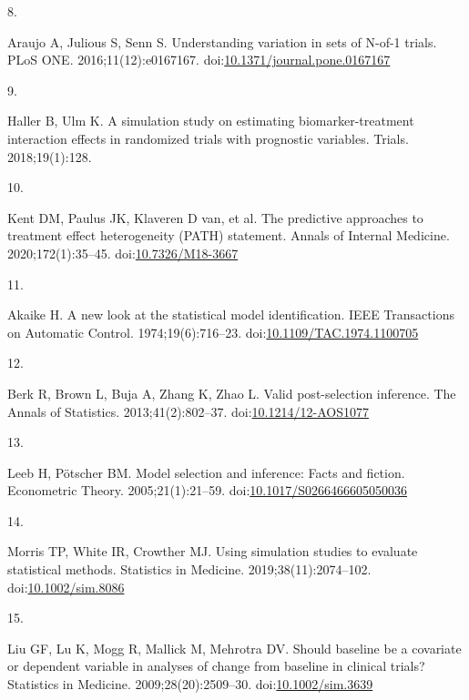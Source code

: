 \documentclass[
  11pt,
]{article}
\newlength{\cslhangindent}
\newlength{\csllabelwidth}
\newenvironment{CSLReferences}[2] %
 {\begin{list}{}{%
  \setlength{\itemindent}{0pt}
  \setlength{\leftmargin}{0pt}
  \setlength{\parsep}{0pt}
  \ifodd #1
   \setlength{\leftmargin}{\cslhangindent}
   \setlength{\itemindent}{-1\cslhangindent}
  \fi
  \setlength{\itemsep}{#2\baselineskip}}}
 {\end{list}}
\newcommand{\CSLLeftMargin}[1]{\parbox[t]{\csllabelwidth}{\strut#1\strut}}
\newcommand{\CSLRightInline}[1]{\parbox[t]{\linewidth - \csllabelwidth}{\strut#1\strut}}
\begin{document}
\begin{CSLReferences}{0}{1}
\CSLLeftMargin{8. }%
\CSLRightInline{Araujo A, Julious S, Senn S. Understanding variation in sets of {N}-of-1 trials. PLoS ONE. 2016;11(12):e0167167. doi:\href{https://doi.org/10.1371/journal.pone.0167167}{10.1371/journal.pone.0167167}}

\CSLLeftMargin{9. }%
\CSLRightInline{Haller B, Ulm K. A simulation study on estimating biomarker-treatment interaction effects in randomized trials with prognostic variables. Trials. 2018;19(1):128.}

\CSLLeftMargin{10. }%
\CSLRightInline{{Kent DM, Paulus JK, Klaveren D van, et al.} The predictive approaches to treatment effect heterogeneity ({PATH}) statement. Annals of Internal Medicine. 2020;172(1):35--45. doi:\href{https://doi.org/10.7326/M18-3667}{10.7326/M18-3667}}

\CSLLeftMargin{11. }%
\CSLRightInline{Akaike H. A new look at the statistical model identification. IEEE Transactions on Automatic Control. 1974;19(6):716--23. doi:\href{https://doi.org/10.1109/TAC.1974.1100705}{10.1109/TAC.1974.1100705}}

\CSLLeftMargin{12. }%
\CSLRightInline{Berk R, Brown L, Buja A, Zhang K, Zhao L. Valid post-selection inference. The Annals of Statistics. 2013;41(2):802--37. doi:\href{https://doi.org/10.1214/12-AOS1077}{10.1214/12-AOS1077}}

\CSLLeftMargin{13. }%
\CSLRightInline{Leeb H, Pötscher BM. Model selection and inference: Facts and fiction. Econometric Theory. 2005;21(1):21--59. doi:\href{https://doi.org/10.1017/S0266466605050036}{10.1017/S0266466605050036}}

\CSLLeftMargin{14. }%
\CSLRightInline{Morris TP, White IR, Crowther MJ. Using simulation studies to evaluate statistical methods. Statistics in Medicine. 2019;38(11):2074--102. doi:\href{https://doi.org/10.1002/sim.8086}{10.1002/sim.8086}}

\CSLLeftMargin{15. }%
\CSLRightInline{Liu GF, Lu K, Mogg R, Mallick M, Mehrotra DV. Should baseline be a covariate or dependent variable in analyses of change from baseline in clinical trials? Statistics in Medicine. 2009;28(20):2509--30. doi:\href{https://doi.org/10.1002/sim.3639}{10.1002/sim.3639}}

\end{CSLReferences}
\end{document}
